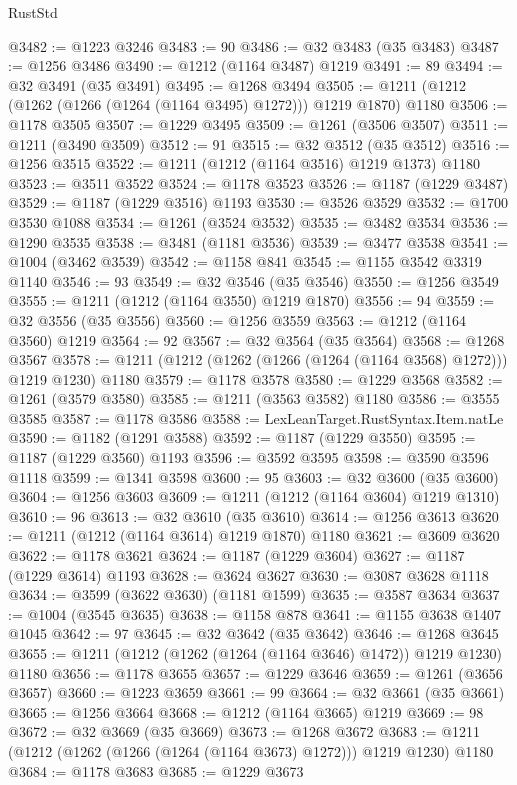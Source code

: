 \begin{lexlean}{RustStd}
\begin{coremodule}
@3482 := @1223 @3246
@3483 := 90
@3486 := @32 @3483 (@35 @3483)
@3487 := @1256 @3486
@3490 := @1212 (@1164 @3487) @1219
@3491 := 89
@3494 := @32 @3491 (@35 @3491)
@3495 := @1268 @3494
@3505 := @1211 (@1212 (@1262 (@1266 (@1264 (@1164 @3495) @1272))) @1219 @1870) @1180
@3506 := @1178 @3505
@3507 := @1229 @3495
@3509 := @1261 (@3506 @3507)
@3511 := @1211 (@3490 @3509)
@3512 := 91
@3515 := @32 @3512 (@35 @3512)
@3516 := @1256 @3515
@3522 := @1211 (@1212 (@1164 @3516) @1219 @1373) @1180
@3523 := @3511 @3522
@3524 := @1178 @3523
@3526 := @1187 (@1229 @3487)
@3529 := @1187 (@1229 @3516) @1193
@3530 := @3526 @3529
@3532 := @1700 @3530 @1088
@3534 := @1261 (@3524 @3532)
@3535 := @3482 @3534
@3536 := @1290 @3535
@3538 := @3481 (@1181 @3536)
@3539 := @3477 @3538
@3541 := @1004 (@3462 @3539)
@3542 := @1158 @841
@3545 := @1155 @3542 @3319 @1140
@3546 := 93
@3549 := @32 @3546 (@35 @3546)
@3550 := @1256 @3549
@3555 := @1211 (@1212 (@1164 @3550) @1219 @1870)
@3556 := 94
@3559 := @32 @3556 (@35 @3556)
@3560 := @1256 @3559
@3563 := @1212 (@1164 @3560) @1219
@3564 := 92
@3567 := @32 @3564 (@35 @3564)
@3568 := @1268 @3567
@3578 := @1211 (@1212 (@1262 (@1266 (@1264 (@1164 @3568) @1272))) @1219 @1230) @1180
@3579 := @1178 @3578
@3580 := @1229 @3568
@3582 := @1261 (@3579 @3580)
@3585 := @1211 (@3563 @3582) @1180
@3586 := @3555 @3585
@3587 := @1178 @3586
@3588 := LexLeanTarget.RustSyntax.Item.natLe
@3590 := @1182 (@1291 @3588)
@3592 := @1187 (@1229 @3550)
@3595 := @1187 (@1229 @3560) @1193
@3596 := @3592 @3595
@3598 := @3590 @3596 @1118
@3599 := @1341 @3598
@3600 := 95
@3603 := @32 @3600 (@35 @3600)
@3604 := @1256 @3603
@3609 := @1211 (@1212 (@1164 @3604) @1219 @1310)
@3610 := 96
@3613 := @32 @3610 (@35 @3610)
@3614 := @1256 @3613
@3620 := @1211 (@1212 (@1164 @3614) @1219 @1870) @1180
@3621 := @3609 @3620
@3622 := @1178 @3621
@3624 := @1187 (@1229 @3604)
@3627 := @1187 (@1229 @3614) @1193
@3628 := @3624 @3627
@3630 := @3087 @3628 @1118
@3634 := @3599 (@3622 @3630) (@1181 @1599)
@3635 := @3587 @3634
@3637 := @1004 (@3545 @3635)
@3638 := @1158 @878
@3641 := @1155 @3638 @1407 @1045
@3642 := 97
@3645 := @32 @3642 (@35 @3642)
@3646 := @1268 @3645
@3655 := @1211 (@1212 (@1262 (@1264 (@1164 @3646) @1472)) @1219 @1230) @1180
@3656 := @1178 @3655
@3657 := @1229 @3646
@3659 := @1261 (@3656 @3657)
@3660 := @1223 @3659
@3661 := 99
@3664 := @32 @3661 (@35 @3661)
@3665 := @1256 @3664
@3668 := @1212 (@1164 @3665) @1219
@3669 := 98
@3672 := @32 @3669 (@35 @3669)
@3673 := @1268 @3672
@3683 := @1211 (@1212 (@1262 (@1266 (@1264 (@1164 @3673) @1272))) @1219 @1230) @1180
@3684 := @1178 @3683
@3685 := @1229 @3673

\end{coremodule}
\end{lexlean}
